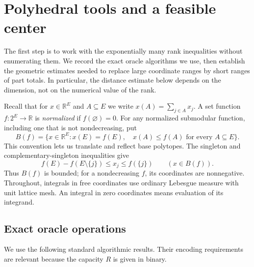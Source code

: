 \section{Polyhedral tools and a feasible center}\label{sec:polyhedra}

The first step is to work with the exponentially many rank inequalities
without enumerating them.  We record the exact oracle algorithms we use,
then establish the geometric estimates needed to replace large coordinate
ranges by short ranges of part totals.  In particular, the distance estimate
below depends on the dimension, not on the numerical value of the rank.

Recall that for $x\in\mathbb R^E$ and $A\subseteq E$ we write
$x(A)=\sum_{j\in A}x_j$.  A set function $f:2^E\to\mathbb R$ is
\emph{normalized} if $f(\varnothing)=0$.  For any normalized submodular
function, including one that is not nondecreasing, put
\begin{equation}\label{eq:base-polytope}
 B(f)=\{x\in\mathbb R^E:x(E)=f(E),\quad x(A)\leq f(A)
                 \text{ for every }A\subseteq E\}.
\end{equation}
This convention lets us translate and reflect base polytopes.  The
singleton and complementary-singleton inequalities give
\[
 f(E)-f(E\setminus\{j\})\leq x_j\leq f(\{j\})
 \qquad (x\in B(f)).
\]
Thus $B(f)$ is bounded; for a nondecreasing $f$, its coordinates are
nonnegative.  Throughout, integrals in free coordinates use ordinary
Lebesgue measure with unit lattice mesh.  An integral in zero coordinates
means evaluation of its integrand.

\subsection{Exact oracle operations}

We use the following standard algorithmic results.  Their encoding
requirements are relevant because the capacity $R$ is given in binary.

